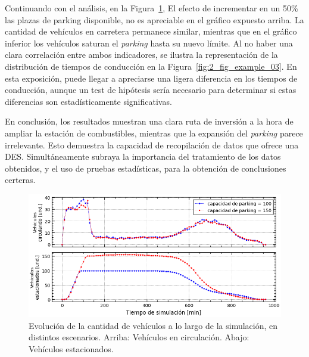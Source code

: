 Continuando con el análisis, en la Figura~\ref{fig:2_fig_example_02},
El efecto de incrementar en un 50\% las plazas de parking disponible,
no es apreciable en el gráfico expuesto arriba.
La cantidad de vehículos en carretera permanece similar,
mientras que en el gráfico inferior los vehículos saturan el \textit{parking}
hasta su nuevo límite.
Al no haber una clara correlación entre ambos indicadores,
se ilustra la representación de la distribución de tiempos de conducción
en la Figura~\ref{fig:2_fig_example_03}.
En esta exposición, puede llegar a apreciarse una ligera diferencia en los tiempos de conducción,
aunque un test de hipótesis sería necesario
para determinar si estas diferencias son estadísticamente significativas.

En conclusión, los resultados muestran una clara ruta de inversión
a la hora de ampliar la estación de combustibles,
mientras que la expansión del \textit{parking} parece irrelevante.
Esto demuestra la capacidad de recopilación de datos que ofrece una DES.
Simultáneamente subraya la importancia del tratamiento de los datos obtenidos,
y el uso de pruebas estadísticas, para la obtención de conclusiones certeras.

\begin{figure}[H]
	\begin{center}
		\includegraphics[width=\textwidth]{fig/2_fig_example_02}
	\end{center}
	\caption{Evolución de la cantidad de vehículos a lo largo de la simulación, en distintos escenarios. Arriba: Vehículos en circulación. Abajo: Vehículos estacionados.}
	\label{fig:2_fig_example_02}
\end{figure}

